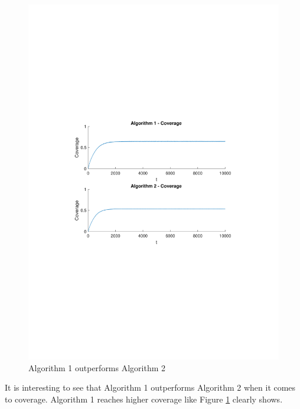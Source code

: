 \begin{figure}
\centering
\includegraphics[width=\textwidth, trim={3cm 10cm 4cm 9cm},clip]{graphics/coverage_alg1_vs_alg2.pdf}
\caption{Algorithm 1 outperforms Algorithm 2}
\label{fig:alg1vsalg2}
\end{figure}
It is interesting to see that Algorithm 1 outperforms Algorithm 2 when it comes to coverage. Algorithm 1 reaches higher coverage like Figure \ref{fig:alg1vsalg2} clearly shows.